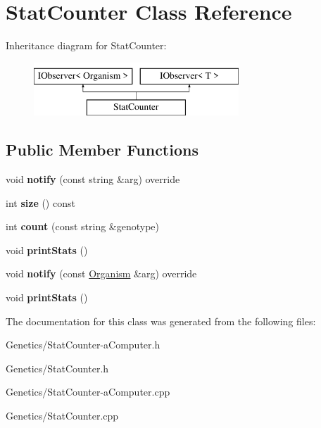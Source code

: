 \hypertarget{class_stat_counter}{}\section{Stat\+Counter Class Reference}
\label{class_stat_counter}
Inheritance diagram for Stat\+Counter\+:\begin{figure}[H]
\begin{center}
\leavevmode
\includegraphics[height=2.000000cm]{class_stat_counter}
\end{center}
\end{figure}
\subsection*{Public Member Functions}
\begin{DoxyCompactItemize}
\item 
void {\bfseries notify} (const string \&arg) override\hypertarget{class_stat_counter_a8b464b2aecafccf3223c4f6e89938c0c}{}\label{class_stat_counter_a8b464b2aecafccf3223c4f6e89938c0c}

\item 
int {\bfseries size} () const \hypertarget{class_stat_counter_a0ac87fe8409052f5b03727c66d9f41ae}{}\label{class_stat_counter_a0ac87fe8409052f5b03727c66d9f41ae}

\item 
int {\bfseries count} (const string \&genotype)\hypertarget{class_stat_counter_a5da59a7c4d30de02716c20491c838f71}{}\label{class_stat_counter_a5da59a7c4d30de02716c20491c838f71}

\item 
void {\bfseries print\+Stats} ()\hypertarget{class_stat_counter_ada1a2c28945b0bedd7840068e6cf770f}{}\label{class_stat_counter_ada1a2c28945b0bedd7840068e6cf770f}

\item 
void {\bfseries notify} (const \hyperlink{class_organism}{Organism} \&arg) override\hypertarget{class_stat_counter_a81f82e98e35f1571565f2e1bc54de471}{}\label{class_stat_counter_a81f82e98e35f1571565f2e1bc54de471}

\item 
void {\bfseries print\+Stats} ()\hypertarget{class_stat_counter_ada1a2c28945b0bedd7840068e6cf770f}{}\label{class_stat_counter_ada1a2c28945b0bedd7840068e6cf770f}

\end{DoxyCompactItemize}


The documentation for this class was generated from the following files\+:\begin{DoxyCompactItemize}
\item 
Genetics/Stat\+Counter-\/a\+Computer.\+h\item 
Genetics/Stat\+Counter.\+h\item 
Genetics/Stat\+Counter-\/a\+Computer.\+cpp\item 
Genetics/Stat\+Counter.\+cpp\end{DoxyCompactItemize}
